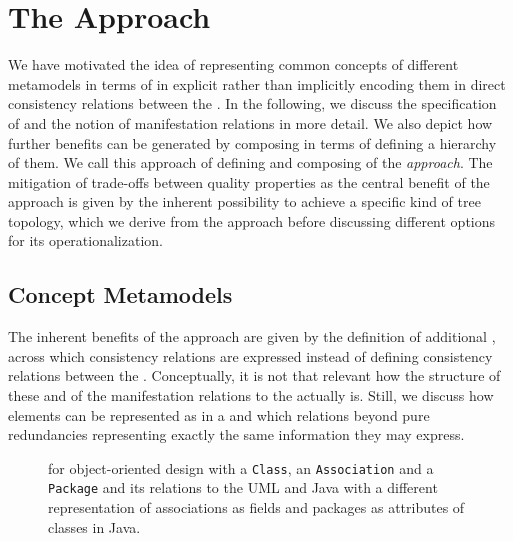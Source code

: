 \section{The \commonalities Approach}
\label{chap:improvement:commonalities}

We have motivated the idea of representing common concepts of different metamodels in terms of \commonalities in explicit \conceptmetamodels rather than implicitly encoding them in direct consistency relations between the \concretemetamodels.
In the following, we discuss the specification of \conceptmetamodels and the notion of manifestation relations in more detail.
We also depict how further benefits can be generated by composing \conceptmetamodels in terms of defining a hierarchy of them.
We call this approach of defining and composing \conceptmetamodels of \commonalities the \emph{\commonalities approach}.
The mitigation of trade-offs between quality properties as the central benefit of the approach is given by the inherent possibility to achieve a specific kind of tree topology, which we derive from the approach before discussing different options for its operationalization.


\subsection{Concept Metamodels}

The inherent benefits of the \commonalities approach are given by the definition of additional \conceptmetamodels, across which consistency relations are expressed instead of defining consistency relations between the \concretemetamodels.
Conceptually, it is not that relevant how the structure of these \conceptmetamodels and of the manifestation relations to the \concretemetamodels actually is.
Still, we discuss how elements can be represented as \commonalities in a \conceptmetamodel and which relations beyond pure redundancies representing exactly the same information they may express.

\begin{figure}
    \centering
    
    \caption[Multiple \commonality example for object-oriented design]{\Conceptmetamodel for object-oriented design with a \texttt{Class}, an \texttt{Association} and a \texttt{Package} \commonality and its relations to the \concretemetamodels \gls{UML} and Java with a different representation of associations as fields and packages as attributes of classes in Java.}
    \label{fig:improvement:multiple_commonalities_example}
\end{figure}


